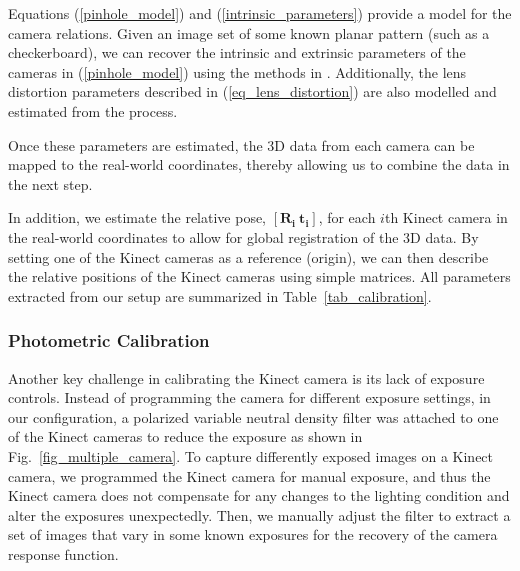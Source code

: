 Equations (\ref{pinhole_model}) and (\ref{intrinsic_parameters}) provide a model for the camera relations. Given an image set of some known planar pattern (such as a checkerboard), we can recover the intrinsic and extrinsic parameters of the cameras in (\ref{pinhole_model}) using the methods in \cite{zhang2000flexible}. Additionally, the lens distortion parameters described in (\ref{eq_lens_distortion}) are also modelled and estimated from the process.

Once these parameters are estimated, the 3D data from each camera can be mapped to the real-world coordinates, thereby allowing us to combine the data in the next step. 


In addition, we estimate the relative pose, $[\mathbf{R_{i}~ t_{i}}]$, for each $i$th Kinect camera in the real-world coordinates to allow for global registration of the 3D data. By setting one of the Kinect cameras as a reference (origin), we can then describe the relative positions of the Kinect cameras using simple matrices. All parameters extracted from our setup are summarized in Table~\ref{tab_calibration}.

\subsubsection{Photometric Calibration}
Another key challenge in calibrating the Kinect camera is its lack of exposure controls. Instead of programming the camera for different exposure settings, in our configuration, a polarized variable neutral density filter was attached to one of the Kinect cameras to reduce the exposure as shown in Fig.~\ref{fig_multiple_camera}. To capture differently exposed images on a Kinect camera, we programmed the Kinect camera for manual exposure, and thus the Kinect camera does not compensate for any changes to the lighting condition and alter the exposures unexpectedly.  Then, we manually adjust the filter to extract a set of images that vary in some known exposures for the recovery of the camera response function\cite{mannist}.


